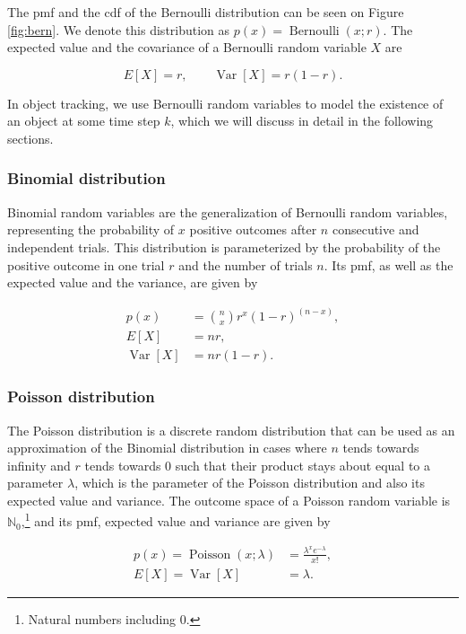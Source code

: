 The pmf and the cdf of the Bernoulli distribution can be seen on Figure \ref{fig:bern}.
We denote this distribution as $p(x) = \operatorname{Bernoulli}(x;r)$.
The expected value and the covariance of a Bernoulli random variable $X$ are

$$
E[X] = r, \qquad \operatorname{Var}[X] = r(1-r).
$$

In object tracking, we use Bernoulli random variables to model the existence of
an object at some time step $k$, which we will discuss in detail in the following
sections.

\subsubsection{Binomial distribution}

Binomial random variables are the generalization of Bernoulli random variables,
representing the probability of $x$ positive outcomes after $n$ consecutive and
independent trials. This distribution is parameterized by the probability of the
positive outcome in one trial $r$ and the number of trials $n$. Its pmf, as well 
as the expected value and the variance, are given by

$$
\begin{aligned}
    p(x) &= \binom{n}{x} r^x (1-r)^{(n-x)}, \\
    E[X] &= nr, \\
    \operatorname{Var}[X] &= nr(1-r).
\end{aligned}
$$

\subsubsection{Poisson distribution}

The Poisson distribution is a discrete random distribution that can 
be used as an approximation of the Binomial distribution in cases where 
$n$ tends towards infinity and $r$ tends towards $0$ such that their 
product stays about equal to a parameter $\lambda$, which is the 
parameter of the Poisson distribution and also its expected value and 
variance. The outcome space of a Poisson random variable is 
$\mathbb{N}_0$,\footnote{Natural numbers including $0$.} and its pmf,
expected value and variance are given by

$$
\begin{aligned}
    p(x) = \operatorname{Poisson}(x; \lambda) &= \frac{\lambda^x e^{-\lambda}}{x !}, \\
    E[X] = \operatorname{Var}[X] &= \lambda.
\end{aligned}
$$

